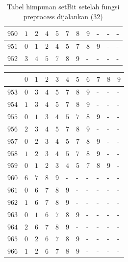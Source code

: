 \begin{appendices}
\begin{table}[H]
\begin{tabular} {|l|l|l|l|l|l|l|l|l|l|l|}
  		$ 950 $ & $ 1 $ &$ 2 $ &$ 4 $ &$ 5 $ &$ 7 $ &$ 8 $ &$ 9 $ & - &  - &  -   \\ \hline
  		$ 951 $ & $ 0 $ &$ 1 $ &$ 2 $ &$ 4 $ &$ 5 $ &$ 7 $ &$ 8 $ &$ 9 $ & - &  -   \\ \hline
  		$ 952 $ & $ 3 $ &$ 4 $ &$ 5 $ &$ 7 $ &$ 8 $ &$ 9 $ & - &  - &  - &  -   \\ \hline
  	\end{tabular}\caption{Tabel himpunan setBit setelah fungsi preprocess dijalankan (32)}
  	\label{tab:setbit_32}
  \end{table}
  \begin{table}[H]
  	\centering
  	\begin{tabular} {|l|l|l|l|l|l|l|l|l|l|l|} \hline
  		\backslashbox{$Num$}{$index$} & $ 0 $ & $ 1 $ & $ 2 $ & $ 3 $ & $ 4 $ & $ 5 $ & $ 6 $ & $ 7 $ & $ 8 $ & $ 9 $ \\ \hline
  		$ 953 $ & $ 0 $ &$ 3 $ &$ 4 $ &$ 5 $ &$ 7 $ &$ 8 $ &$ 9 $ & - &  - &  -   \\ \hline
  		$ 954 $ & $ 1 $ &$ 3 $ &$ 4 $ &$ 5 $ &$ 7 $ &$ 8 $ &$ 9 $ & - &  - &  -   \\ \hline
  		$ 955 $ & $ 0 $ &$ 1 $ &$ 3 $ &$ 4 $ &$ 5 $ &$ 7 $ &$ 8 $ &$ 9 $ & - &  -   \\ \hline
  		$ 956 $ & $ 2 $ &$ 3 $ &$ 4 $ &$ 5 $ &$ 7 $ &$ 8 $ &$ 9 $ & - &  - &  -   \\ \hline
  		$ 957 $ & $ 0 $ &$ 2 $ &$ 3 $ &$ 4 $ &$ 5 $ &$ 7 $ &$ 8 $ &$ 9 $ & - &  -   \\ \hline
  		$ 958 $ & $ 1 $ &$ 2 $ &$ 3 $ &$ 4 $ &$ 5 $ &$ 7 $ &$ 8 $ &$ 9 $ & - &  -   \\ \hline
  		$ 959 $ & $ 0 $ &$ 1 $ &$ 2 $ &$ 3 $ &$ 4 $ &$ 5 $ &$ 7 $ &$ 8 $ &$ 9 $ & -   \\ \hline
  		$ 960 $ & $ 6 $ &$ 7 $ &$ 8 $ &$ 9 $ & - &  - &  - &  - &  - &  -   \\ \hline
  		$ 961 $ & $ 0 $ &$ 6 $ &$ 7 $ &$ 8 $ &$ 9 $ & - &  - &  - &  - &  -   \\ \hline
  		$ 962 $ & $ 1 $ &$ 6 $ &$ 7 $ &$ 8 $ &$ 9 $ & - &  - &  - &  - &  -   \\ \hline
  		$ 963 $ & $ 0 $ &$ 1 $ &$ 6 $ &$ 7 $ &$ 8 $ &$ 9 $ & - &  - &  - &  -   \\ \hline
  		$ 964 $ & $ 2 $ &$ 6 $ &$ 7 $ &$ 8 $ &$ 9 $ & - &  - &  - &  - &  -   \\ \hline
  		$ 965 $ & $ 0 $ &$ 2 $ &$ 6 $ &$ 7 $ &$ 8 $ &$ 9 $ & - &  - &  - &  -   \\ \hline
  		$ 966 $ & $ 1 $ &$ 2 $ &$ 6 $ &$ 7 $ &$ 8 $ &$ 9 $ & - &  - &  - &  -   \\ \hline

\end{tabular}
\end{table}
\end{appendices}
